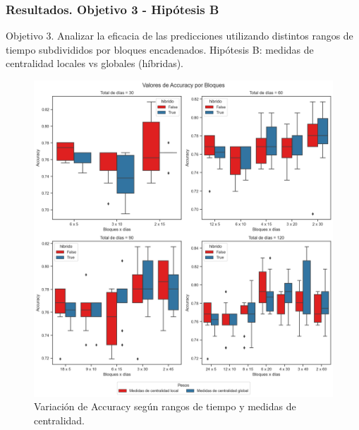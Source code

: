 \documentclass{beamer}
\begin{document}
\begin{frame}
	\frametitle{Resultados. Objetivo 3 - Hipótesis B}
	\begin{block}{Objetivo 3. Analizar la eficacia de las predicciones utilizando distintos rangos de tiempo subdivididos por bloques encadenados.}
		Hipótesis B: medidas de centralidad locales vs globales (híbridas).
	\end{block}
	

\begin{figure}[H]
	\centering
	\includegraphics[width=0.45\linewidth]{figs/cap6/figura_105}
	\caption{Variación de Accuracy según rangos de tiempo y medidas de centralidad.}
	
	\label{fig:figura105}
\end{figure}

	
\end{frame}
\end{document}
